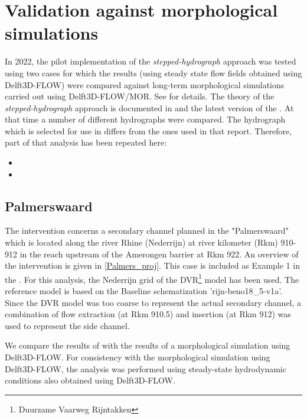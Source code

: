 \chapter{Validation against morphological simulations} \label{Chp:Morphology}

In 2022, the pilot implementation of the \emph{stepped-hydrograph} approach was tested using two cases for which the \dfastmi results (using steady state flow fields obtained using Delft3D-FLOW) were compared against long-term morphological simulations carried out using Delft3D-FLOW/MOR.
See \citet{GiriJagers2022} for details.
The theory of the \emph{stepped-hydrograph} approach is documented in \citet{JagersGiri2022} and the latest version of the \citet{um}.
At that time a number of different hydrographs were compared.
The hydrograph which is selected for use in  differs from the ones used in that report.
Therefore, part of that analysis has been repeated here:

\begin{itemize}
\item {}
\item {}
\end{itemize}

\section{Palmerswaard} \label{Sec:Palmerswaard}

The intervention concerns a secondary channel planned in the "Palmerswaard" which is located along the river Rhine (Nederrijn) at river kilometer (Rkm) 910-912 in the reach upstream of the Amerongen barrier at Rkm 922.
An overview of the intervention is given in \autoref{Palmers_proj}.
This case is included as Example 1 in the \citet{um}.
For this analysis, the Nederrijn grid of the DVR\footnote{Duurzame Vaarweg Rijntakken} model has been used.
The reference model is based on the Baseline schematization 'rijn-beno18\_5-v1a'.
Since the DVR model was too coarse to represent the actual secondary channel, a combination of flow extraction (at Rkm 910.5) and insertion (at Rkm 912) was used to represent the side channel.

We compare the results of \dfmi with the results of a morphological simulation using Delft3D-FLOW.
For consistency with the morphological simulation using Delft3D-FLOW, the \dfmi analysis was performed using steady-state hydrodynamic conditions also obtained using Delft3D-FLOW.

